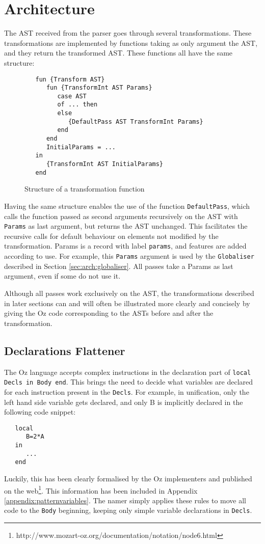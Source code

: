 \documentclass[a4paper]{memoir}
\begin{document}
\section{Architecture}
The AST received from the parser goes through several transformations. These transformations are implemented by functions taking as only argument the AST, and they return the transformed AST.
These functions all have the same structure:
\begin{figure}[h]
\begin{lstlisting}
   fun {Transform AST}
      fun {TransformInt AST Params}
         case AST
         of ... then
         else
            {DefaultPass AST TransformInt Params}
         end
      end
      InitialParams = ...
   in
      {TransformInt AST InitialParams}
   end
\end{lstlisting}
\caption{Structure of a transformation function}
\end{figure}
Having the same structure enables the use of the function \lstinline!DefaultPass!, which calls the function passed as second arguments recursively on the AST with \lstinline!Params! as last argument, but returns the AST unchanged. This facilitates the recursive calls for default behaviour on elements not modified by the transformation.
Params is a record with label \lstinline!params!, and features are added
according to use. For example, this \lstinline!Params! argument is used by
the \lstinline!Globaliser! described in Section \ref{sec:arch:globaliser}. All
passes take a Params as last argument, even if some do not use it. 


Although all passes work exclusively on the AST, the transformations described in later sections can and will often be illustrated more clearly and concisely by giving the Oz code corresponding to the ASTs before and after the transformation. 

\subsection{Declarations Flattener}\label{sec:arch:declsflattener}
The Oz language accepts complex instructions in the declaration part of \lstinline!local Decls in Body end!. This brings the need to decide what variables are declared for each instruction present in the \lstinline!Decls!. 
For example, in unification, only the left hand side variable gets declared, and only B is implicitly declared in the following code snippet:
\begin{lstlisting}
   local
      B=2*A
   in
      ...
   end
\end{lstlisting}
Luckily, this has been clearly formalised by the Oz implementers and published on the web\footnote[]{http://www.mozart-oz.org/documentation/notation/node6.html}. This information has been included in Appendix \ref{appendix:patternvariables}. The namer simply applies these rules to move all code to the \lstinline!Body! beginning, keeping only simple variable declarations in \lstinline!Decls!.
\end{document}
